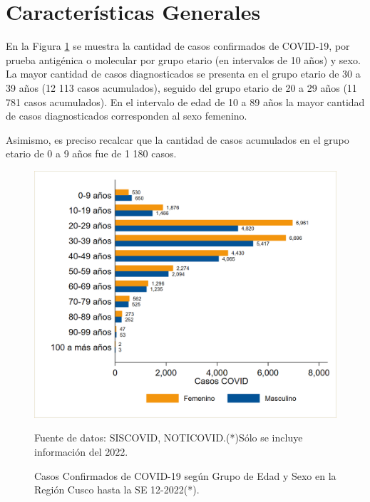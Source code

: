 \documentclass[12pt,a4paper,openany]{book}
\begin{document}
	
	 
	
	\clearpage	
	\section*{Características Generales}
	
	
	
 	\noindent En la Figura \ref{fig:casos_edad_sexo} se muestra la cantidad de casos confirmados de COVID-19, por prueba antigénica o molecular por grupo etario (en intervalos de 10 años) y sexo. La mayor cantidad de casos diagnosticados se presenta en el grupo etario de  30 a 39 años  (12 113 casos acumulados), seguido del grupo etario de 20 a 29 años (11 781 casos acumulados). 
 En el intervalo de edad de 10 a 89 años la mayor cantidad de casos diagnosticados corresponden al sexo femenino.  
 
 Asimismo, es preciso recalcar que la cantidad de casos acumulados en el grupo etario de 0 a 9 años fue de 1 180 casos. 
 	
 	
\begin{figure}[h]
	\caption{Casos Confirmados de COVID-19 según Grupo de Edad y Sexo en la Región Cusco hasta la SE 12-2022(*).}\label{fig:casos_edad_sexo}
	\begin{center}
		\includegraphics[width=0.75\linewidth]{../figuras/casos_etapavida_2022}
	\end{center}
	{\footnotesize {Fuente de datos: SISCOVID, NOTICOVID.(*)Sólo se incluye información del 2022.}}
\end{figure}
\pagebreak
\end{document}

